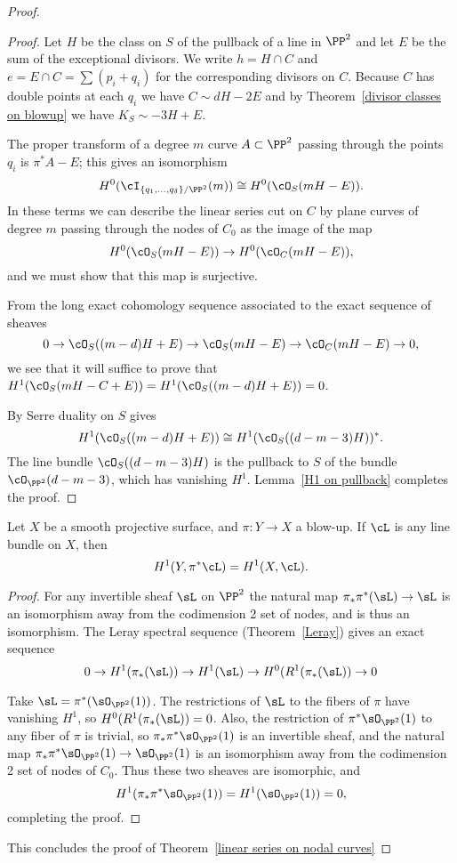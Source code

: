 \begin{proof}
\begin{proof}
Let $H$ be the class on $S$ of the pullback of a line in $\PP^2$  and let $E$ be the sum of the exceptional divisors. We write $h= H\cap C$ and $e = E\cap C= \sum (p_i+q_i)$ for the corresponding divisors on $C$. 
Because $C$ has double points at each $q_{i}$ we have
$
C \sim dH - 2E 
$
and   by
Theorem~\ref{divisor classes on blowup} we have $K_S \sim -3H + E$.

The proper transform of a degree $m$ curve $A\subset \PP^2$  passing through the points $q_i$
is $\pi^*A - E$; this gives an isomorphism
$$
H^0(\cI_{\{q_1,\dots,q_\delta\}/\PP^2}(m)) \cong H^0(\cO_S(mH-E)).
$$
In these terms we can describe the linear series cut on $C$ by plane curves of degree $m$ passing through the nodes of $C_0$ as the image of the map
$$
H^0(\cO_S(mH-E)) \to H^0(\cO_C(mH-E)),
$$
and we must show that this map is surjective.

From the long exact cohomology sequence associated to the exact sequence of sheaves
$$
0 \to \cO_S((m-d)H + E)  \to \cO_S(mH-E) \to \cO_C(mH-E) \to 0,
$$
 we see that it will suffice to prove that $H^1(\cO_S(mH - C + E)) = H^1(\cO_S((m-d)H + E)) = 0$. 
 
By Serre duality on $S$ gives
$$
H^1(\cO_S((m-d)H + E)) \cong H^1(\cO_S((d-m-3)H))^*.
$$
The line bundle $\cO_S((d-m-3)H)$ is 
 the pullback to $S$ of the bundle $\cO_{\PP^2}(d-m-3)$, which has vanishing $H^1$. Lemma~\ref{H1 on pullback} completes the proof.
\end{proof}

\begin{lemma}\label{H1 on pullback}
Let $X$ be a smooth projective surface, and $\pi : Y \to X$ a blow-up. If $\cL$ is any line bundle on $X$, then
$$
H^1(Y, \pi^*\cL) = H^1(X, \cL).
$$
\end{lemma}
\begin{proof}
For any invertible sheaf $\sL$ on $\PP^{2}$ the natural map $\pi_{*}\pi^{*}(\sL) \to \sL$ is an isomorphism
away from the codimension 2 set of nodes, and is thus an isomorphism. The Leray spectral sequence (Theorem~\ref{Leray}) gives an exact sequence
$$
0\to H^{1}(\pi_{*}(\sL)) \to H^{1}(\sL) \to  H^{0}(R^{1}(\pi_{*}(\sL))\to 0
$$

Take $\sL = \pi^{*}(\sO_{\PP^{2}}(1))$. The restrictions of $\sL$ to the fibers of $\pi$ have vanishing $H^{1}$,
so
$H^{0}(R^{1}(\pi_{*}(\sL)) = 0$.
Also, the restriction of $\pi^{*}\sO_{\PP^{2}}(1)$ to any fiber of $\pi$ is trivial,
so $\pi_{*}\pi^{*}\sO_{\PP^{2}}(1)$ is an invertible sheaf, and the natural map
$\pi_{*}\pi^{*}\sO_{\PP^{2}}(1) \to \sO_{\PP^{2}}(1)$ is an isomorphism away from the codimension
2 set of nodes of $C_{0}$. Thus these two sheaves are isomorphic, and
$$
H^{1}(\pi_{*}\pi^{*}\sO_{\PP^{2}}(1) ) = H^{1}(\sO_{\PP^{2}}(1)) = 0,
$$
completing the proof.
\end{proof}

This concludes the proof of Theorem~\ref{linear series on nodal curves}
\end{proof}



